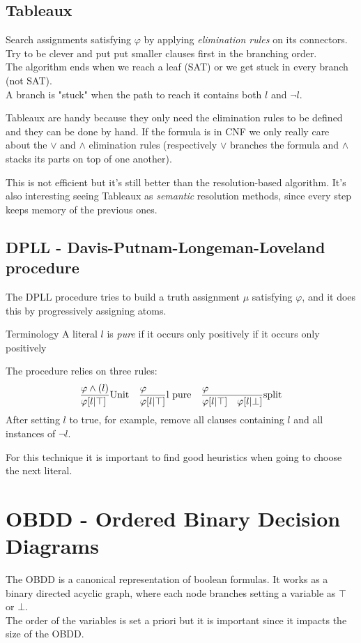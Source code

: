 \documentclass{article}
\begin{document}
\subsection{Tableaux}
Search assignments satisfying $\varphi$ by applying \textit{elimination rules} on its connectors.\\
Try to be clever and put put smaller clauses first in the branching order.\\
The algorithm ends when we reach a leaf (SAT) or we get stuck in every branch (not SAT).\\
A branch is "stuck" when the path to reach it contains both $l$ and $\neg l$.

Tableaux are handy because they only need the elimination rules to be defined and they can be done by hand.
If the formula is in CNF we only really care about the $\vee$ and $\wedge$ elimination rules (respectively $\vee$ branches the formula and $\wedge$ stacks its parts on top of one another).

This is not efficient but it's still better than the resolution-based algorithm. It's also interesting seeing Tableaux as \textit{semantic} resolution methods, since every step keeps memory of the previous ones.

\subsection{DPLL - Davis-Putnam-Longeman-Loveland procedure}
The DPLL procedure tries to build a truth assignment $\mu$ satisfying $\varphi$, and it does this by progressively assigning atoms.
\begin{callout}[blue]{Terminology}
    A literal $l$ is \textit{pure} if it occurs only positively if it occurs only positively
\end{callout}
The procedure relies on three rules:
\begin{gather*}
    \begin{array}{lcr}
        \st[Unit]{\varphi [l|\top]}{\varphi \wedge (l)} &
        \st[l pure]{\varphi [l|\top]}{\varphi} &
        \st[split]{\varphi[l|\top]\quad \varphi[l|\bot]}{\varphi}
    \end{array}
\end{gather*}
After setting $l$ to true, for example, remove all clauses containing $l$ and all instances of $\neg l$.

For this technique it is important to find good heuristics when going to choose the next literal.

\section{OBDD - Ordered Binary Decision Diagrams}
The OBDD is a canonical representation of boolean formulas. It works as a binary directed acyclic graph, where each node branches setting a variable as $\top$ or $\bot$.\\
The order of the variables is set a priori but it is important since it impacts the size of the OBDD.
\end{document}
